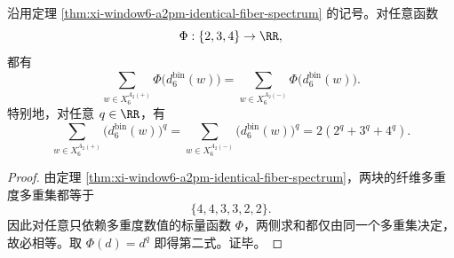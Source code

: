 \begin{corollary}\label{cor:xi-window6-a2pm-multiplicity-blind-statistics}
沿用定理 \ref{thm:xi-window6-a2pm-identical-fiber-spectrum} 的记号。对任意函数
\[
\Phi:\{2,3,4\}\to \RR,
\]
都有
\[
\sum_{w\in X_6^{A_2(+)}}\Phi\!\bigl(d_6^{\mathrm{bin}}(w)\bigr)
=
\sum_{w\in X_6^{A_2(-)}}\Phi\!\bigl(d_6^{\mathrm{bin}}(w)\bigr).
\]
特别地，对任意 \(q\in\RR\)，有
\[
\sum_{w\in X_6^{A_2(+)}}\bigl(d_6^{\mathrm{bin}}(w)\bigr)^q
=
\sum_{w\in X_6^{A_2(-)}}\bigl(d_6^{\mathrm{bin}}(w)\bigr)^q
=
2(2^q+3^q+4^q).
\]
\end{corollary}
\begin{proof}
由定理 \ref{thm:xi-window6-a2pm-identical-fiber-spectrum}，两块的纤维多重度多重集都等于
\[
\{4,4,3,3,2,2\}.
\]
因此对任意只依赖多重度数值的标量函数 \(\Phi\)，两侧求和都仅由同一个多重集决定，故必相等。取 \(\Phi(d)=d^q\) 即得第二式。证毕。
\end{proof}

